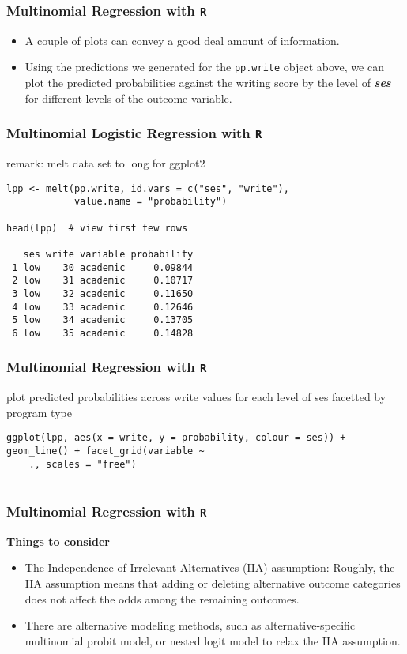 \documentclass[00-GLMregslides.tex]{subfiles}
\begin{document}
\begin{frame}[fragile]

\frametitle{Multinomial Regression with \texttt{R}}
\Large
\begin{itemize}
\item A couple of plots can convey a good deal amount of information. 
\item Using the predictions we generated for the \texttt{pp.write} object above, we can plot the predicted probabilities against the writing score by the level 
of \textbf{\textit{ses}} for different levels of the outcome variable.
\end{itemize} 
\end{frame}
\begin{frame}[fragile]

\frametitle{Multinomial Logistic Regression with \texttt{R}}
\large
remark: melt data set to long for ggplot2
\begin{verbatim}
lpp <- melt(pp.write, id.vars = c("ses", "write"),
            value.name = "probability")
 
head(lpp)  # view first few rows
 
   ses write variable probability
 1 low    30 academic     0.09844
 2 low    31 academic     0.10717
 3 low    32 academic     0.11650
 4 low    33 academic     0.12646
 5 low    34 academic     0.13705
 6 low    35 academic     0.14828
\end{verbatim}
\end{frame}
\begin{frame}[fragile]

\frametitle{Multinomial Regression with \texttt{R}}
\Large 
 plot predicted probabilities across write values for each level of ses
 facetted by program type
\begin{verbatim}
ggplot(lpp, aes(x = write, y = probability, colour = ses)) + geom_line() + facet_grid(variable ~
    ., scales = "free")
 
\end{verbatim}
\end{frame}
\begin{frame}[fragile]

\frametitle{Multinomial Regression with \texttt{R}}
\Large
\textbf{Things to consider}
\begin{itemize}
\item The Independence of Irrelevant Alternatives (IIA) assumption: Roughly, the IIA assumption means that adding or deleting alternative outcome categories does not affect the odds among the remaining outcomes. \item There are alternative modeling methods, such as alternative-specific multinomial probit model, or nested logit model to relax the IIA assumption.
\end{itemize}

\end{frame}
\end{document}
